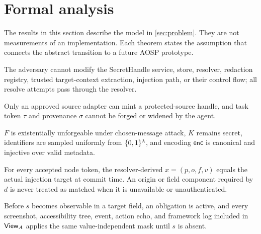 \section{Formal analysis}
\label{sec:theory}



The results in this section describe the model in \cref{sec:problem}. They are not measurements of an implementation. Each theorem states the assumption that connects the abstract transition to a future AOSP prototype.

\begin{assumption}
\label{ass:tcb}
The adversary cannot modify the SecretHandle service, store, resolver, redaction registry, trusted target-context extraction, injection path, or their control flow; all resolve attempts pass through the resolver.
\end{assumption}

\begin{assumption}
\label{ass:source}
Only an approved source adapter can mint a protected-source handle, and task token $\tau$ and provenance $\sigma$ cannot be forged or widened by the agent.
\end{assumption}

\begin{assumption}
\label{ass:crypto}
$F$ is existentially unforgeable under chosen-message attack, $K$ remains secret, identifiers are sampled uniformly from $\{0,1\}^\lambda$, and encoding $\mathsf{enc}$ is canonical and injective over valid metadata.
\end{assumption}

\begin{assumption}
\label{ass:identity}
For every accepted node token, the resolver-derived $x=(p,o,f,v)$ equals the actual injection target at commit time. An origin or field component required by $d$ is never treated as matched when it is unavailable or unauthenticated.
\end{assumption}

\begin{assumption}
\label{ass:redaction}
Before $s$ becomes observable in a target field, an obligation is active, and every screenshot, accessibility tree, event, action echo, and framework log included in $\mathsf{View}_A$ applies the same value-independent mask until $s$ is absent.
\end{assumption}

